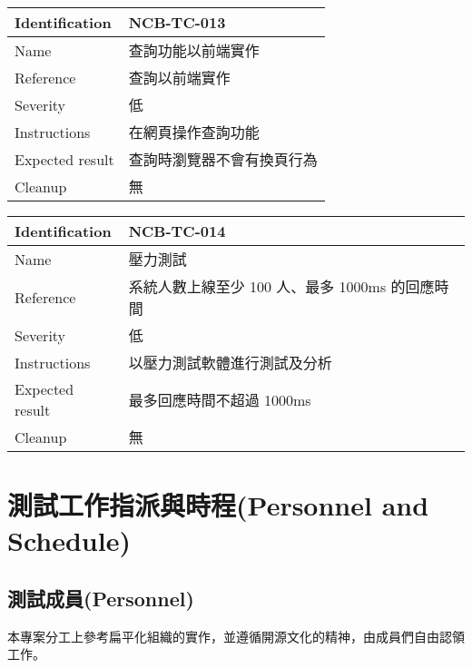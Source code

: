 \documentclass{article}
\begin{document}
\bigskip

\begin{tabularx}{\textwidth}{| A{0.3\textwidth} | X |}
	\hline
	Identification  & NCB-TC-013    \\ \hline
	Name            & 查詢功能以前端實作     \\ \hline
	Reference       & 查詢以前端實作       \\ \hline
	Severity        & 低             \\ \hline
	Instructions    & 在網頁操作查詢功能     \\ \hline
	Expected result & 查詢時瀏覽器不會有換頁行為 \\ \hline
	Cleanup         & 無             \\ \hline
\end{tabularx}

\bigskip

\begin{tabularx}{\textwidth}{| A{0.3\textwidth} | X |}
	\hline
	Identification  & NCB-TC-014                     \\ \hline
	Name            & 壓力測試                           \\ \hline
	Reference       & 系統人數上線至少 100 人、最多 1000ms 的回應時間 \\ \hline
	Severity        & 低                              \\ \hline
	Instructions    & 以壓力測試軟體進行測試及分析                 \\ \hline
	Expected result & 最多回應時間不超過 1000ms               \\ \hline
	Cleanup         & 無                              \\ \hline
\end{tabularx}

\newpage

\section[測試工作指派與時程(PERSONNEL AND SCHEDULE)]{測試工作指派與時程(Personnel and Schedule)}

\subsection[測試成員(PERSONNEL)]{測試成員(Personnel)}

本專案分工上參考扁平化組織的實作，並遵循開源文化的精神，由成員們自由認領工作。

\newpage
\end{document}
